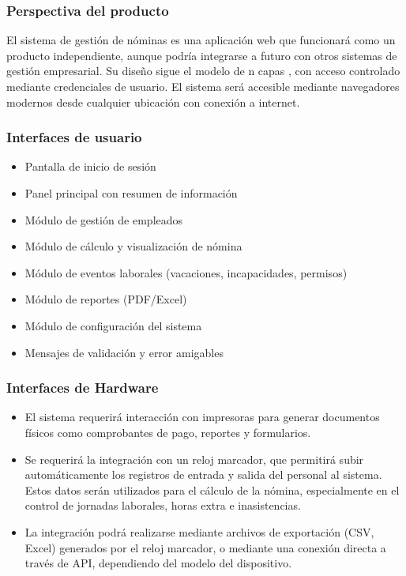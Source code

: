 \subsubsection*{Perspectiva del producto}

El sistema de gestión de nóminas es una aplicación web que funcionará como un
producto independiente, aunque podría integrarse a futuro con otros sistemas de gestión
empresarial. Su diseño sigue el modelo de n capas , con acceso controlado mediante
credenciales de usuario. El sistema será accesible mediante navegadores modernos desde
cualquier ubicación con conexión a internet.

\subsubsection*{Interfaces de usuario}

\begin{itemize}
	\item Pantalla de inicio de sesión
	\item Panel principal con resumen de información
	\item Módulo de gestión de empleados
	\item Módulo de cálculo y visualización de nómina
	\item Módulo de eventos laborales (vacaciones, incapacidades, permisos)
	\item Módulo de reportes (PDF/Excel)
	\item Módulo de configuración del sistema
	\item Mensajes de validación y error amigables
\end{itemize}

\subsubsection*{Interfaces de Hardware}

\begin{itemize}
	\item El sistema requerirá interacción con impresoras para generar documentos
	      físicos como comprobantes de pago, reportes y formularios.

	\item Se requerirá la integración con un reloj marcador, que permitirá subir
	      automáticamente los registros de entrada y salida del personal al sistema.
	      Estos datos serán utilizados para el cálculo de la nómina, especialmente en
	      el control de jornadas laborales, horas extra e inasistencias.

	\item La integración podrá realizarse mediante archivos de exportación (CSV, Excel)
	      generados por el reloj marcador, o mediante una conexión directa a través de API,
	      dependiendo del modelo del dispositivo.

\end{itemize}


